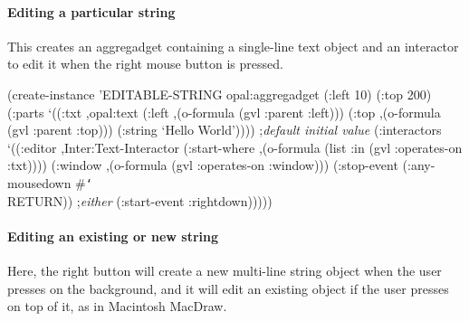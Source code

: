 \paragraph{Editing a particular string}
This creates an aggregadget containing a single-line text object and an
interactor to edit it when the right mouse button is pressed.
\begin{programexample}
(create-instance 'EDITABLE-STRING opal:aggregadget
   (:left 10)
   (:top 200)
   (:parts
    `((:txt ,opal:text
	    (:left ,(o-formula (gvl :parent :left)))
	    (:top ,(o-formula (gvl :parent :top)))
	    (:string `Hello World')))) ;{\it default initial value}
   (:interactors
    `((:editor ,Inter:Text-Interactor
	       (:start-where ,(o-formula (list :in (gvl :operates-on :txt))))
	       (:window ,(o-formula (gvl :operates-on :window)))
	       (:stop-event (:any-mousedown \#{\tt\char`\\}RETURN)) ;{\it either}
	       (:start-event :rightdown)))))
\end{programexample}

\paragraph{Editing an existing or new string}
\label{editstringexample}
Here, the right button will create a new multi-line string object when the
user presses on
the background, and it will edit an existing object if the user presses on
top of it, as in Macintosh MacDraw.

